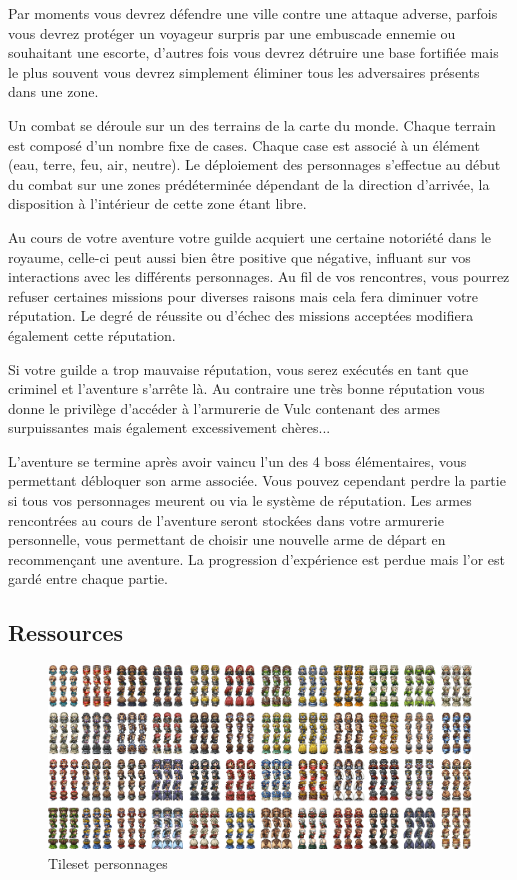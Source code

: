 \documentclass[a4paper,12pt]{article}
\begin{document}
    Par moments vous devrez défendre une ville contre une attaque adverse, parfois vous devrez protéger un voyageur surpris par une embuscade ennemie ou souhaitant une escorte, d'autres fois vous devrez détruire une base fortifiée mais le plus souvent vous devrez simplement éliminer tous les adversaires présents dans une zone.
    
    Un combat se déroule sur un des terrains de la carte du monde. Chaque terrain est composé d'un nombre fixe de cases. Chaque case est associé à un élément (eau, terre, feu, air, neutre). Le déploiement des personnages s'effectue au début du combat sur une zones prédéterminée dépendant de la direction d'arrivée, la disposition à l'intérieur de cette zone étant libre.
    
    Au cours de votre aventure votre guilde acquiert une certaine notoriété dans le royaume, celle-ci peut aussi bien être positive que négative, influant sur vos interactions avec les différents personnages. Au fil de vos rencontres, vous pourrez refuser certaines missions pour diverses raisons mais cela fera diminuer votre réputation. Le degré de réussite ou d'échec des missions acceptées modifiera également cette réputation.
    
    Si votre guilde a trop mauvaise réputation, vous serez exécutés en tant que criminel et l'aventure s'arrête là. Au contraire une très bonne réputation vous donne le privilège d'accéder à l'armurerie de Vulc contenant des armes surpuissantes mais également excessivement chères...
    
     L'aventure se termine après avoir vaincu l'un des 4 boss élémentaires, vous permettant débloquer son arme associée. Vous pouvez cependant perdre la partie si tous vos personnages meurent ou via le système de réputation. Les armes rencontrées au cours de l'aventure seront stockées dans votre armurerie personnelle, vous permettant de choisir une nouvelle arme de départ en recommençant une aventure. La progression d'expérience est perdue mais l'or est gardé entre chaque partie.
    
\subsection{Ressources}

    \begin{figure}[ht]
        \centering
        \includegraphics[width=\textwidth]{persos.png}
        \caption{Tileset personnages}
    \end{figure}
    
\end{document}
